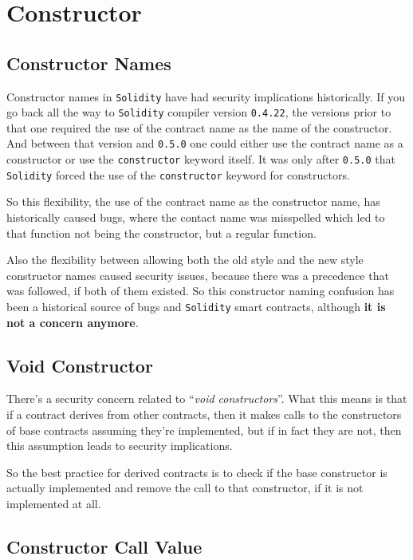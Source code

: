 \section{Constructor}\label{constructor}

\subsection{Constructor Names}\label{constructor-names}

Constructor names in \texttt{Solidity} have had security implications
historically. If you go back all the way to \texttt{Solidity} compiler
version \texttt{0.4.22}, the versions prior to that one required the use
of the contract name as the name of the constructor. And between that
version and \texttt{0.5.0} one could either use the contract name as a
constructor or use the \texttt{constructor} keyword itself. It was only
after \texttt{0.5.0} that \texttt{Solidity} forced the use of the
\texttt{constructor} keyword for constructors.

So this flexibility, the use of the contract name as the constructor
name, has historically caused bugs, where the contact name was
misspelled which led to that function not being the constructor, but a
regular function.

Also the flexibility between allowing both the old style and the new
style constructor names caused security issues, because there was a
precedence that was followed, if both of them existed. So this
constructor naming confusion has been a historical source of bugs and
\texttt{Solidity} smart contracts, although \textbf{it is not a concern
anymore}.

\subsection{Void Constructor}\label{void-constructor}

There's a security concern related to ``\emph{void constructors}''. What
this means is that if a contract derives from other contracts, then it
makes calls to the constructors of base contracts assuming they're
implemented, but if in fact they are not, then this assumption leads to
security implications.

So the best practice for derived contracts is to check if the base
constructor is actually implemented and remove the call to that
constructor, if it is not implemented at all.

\subsection{Constructor Call Value}\label{constructor-call-value}

